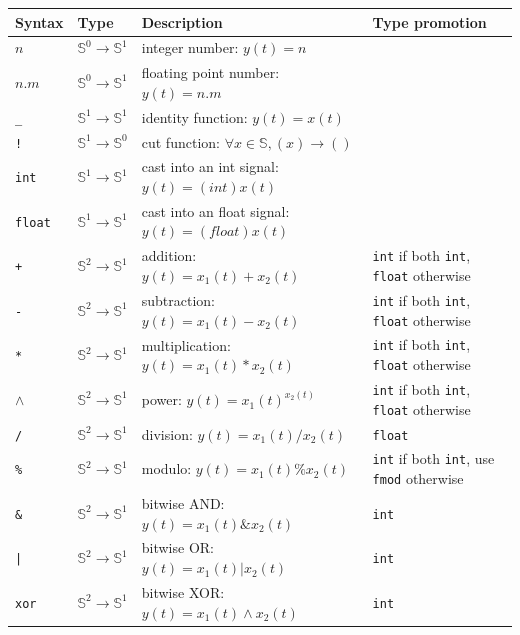 \begin{tabular}{|l|l|l|l|}
\hline
\textbf{Syntax} & \textbf{Type}  & \textbf{Description}   & \textbf{Type promotion} \\
\hline
$n$ & $\mathbb{S}^{0}\rightarrow\mathbb{S}^{1}$ & integer number: $y(t)=n$ 			&  \\
$n.m$ & $\mathbb{S}^{0}\rightarrow\mathbb{S}^{1}$ & floating point number: $y(t)=n.m$	&  \\

\texttt{\_} & $\mathbb{S}^{1}\rightarrow\mathbb{S}^{1}$ & identity function: $y(t)=x(t)$	&  \\
\texttt{!} & $\mathbb{S}^{1}\rightarrow\mathbb{S}^{0}$ & cut function: $\forall x\in\mathbb{S},(x)\rightarrow ()$	&  \\

\texttt{int} & $\mathbb{S}^{1}\rightarrow\mathbb{S}^{1}$ & cast into an int signal: $y(t)=(int)x(t)$  		&  \\
\texttt{float} & $\mathbb{S}^{1}\rightarrow\mathbb{S}^{1}$ & cast into an float signal: $y(t)=(float)x(t)$  	&  \\

\texttt{+} & $\mathbb{S}^{2}\rightarrow\mathbb{S}^{1}$ & addition: $y(t)=x_{1}(t)+x_{2}(t)$ 		& \texttt{int} if both \texttt{int}, \texttt{float} otherwise \\
\texttt{-} & $\mathbb{S}^{2}\rightarrow\mathbb{S}^{1}$ & subtraction: $y(t)=x_{1}(t)-x_{2}(t)$  		& \texttt{int} if both \texttt{int}, \texttt{float} otherwise \\
\texttt{*} & $\mathbb{S}^{2}\rightarrow\mathbb{S}^{1}$ & multiplication: $y(t)=x_{1}(t)*x_{2}(t)$  		& \texttt{int} if both \texttt{int}, \texttt{float} otherwise \\
\texttt{$\land$} & $\mathbb{S}^{2}\rightarrow\mathbb{S}^{1}$ & power: $y(t)=x_{1}(t)^{x_{2}(t)}$ 	& \texttt{int} if both \texttt{int}, \texttt{float} otherwise \\
\texttt{/} & $\mathbb{S}^{2}\rightarrow\mathbb{S}^{1}$ & division: $y(t)=x_{1}(t)/x_{2}(t)$  			& \texttt{float} \\
\texttt{\%} & $\mathbb{S}^{2}\rightarrow\mathbb{S}^{1}$ & modulo: $y(t)=x_{1}(t)\%x_{2}(t)$  		&  \texttt{int} if both \texttt{int}, use \texttt{fmod} otherwise \\

\texttt{\&} & $\mathbb{S}^{2}\rightarrow\mathbb{S}^{1}$ & bitwise AND: $y(t)=x_{1}(t)\&x_{2}(t)$  		& \texttt{int} \\
\texttt{|} & $\mathbb{S}^{2}\rightarrow\mathbb{S}^{1}$ & bitwise OR: $y(t)=x_{1}(t)|x_{2}(t)$  			& \texttt{int} \\
\texttt{xor} & $\mathbb{S}^{2}\rightarrow\mathbb{S}^{1}$ & bitwise XOR: $y(t)=x_{1}(t)\land x_{2}(t)$   	& \texttt{int} \\


\end{tabular}
